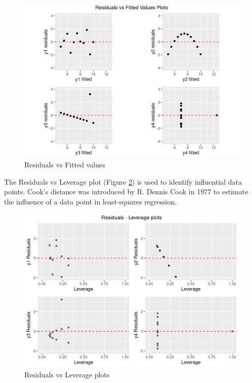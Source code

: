 \documentclass[12pt]{article}
\begin{document}
\begin{figure}[htbp]
\includegraphics[width=.7\textwidth]{RVF.png}
\centering
\caption{Residuals vs Fitted values}
\label{Fig:RVF}
\end{figure}

The Residuals vs Leverage plot (Figure \ref{Fig:RVL}) is used to identify influential data points. Cook's distance was introduced by R. Dennis Cook in 1977 to estimate the  influence of a data point in least-squares regression.

\begin{figure}[htbp]
\includegraphics[width=.7\textwidth]{RVL.png}
\centering
\caption{Residuals vs Leverage plots}
\label{Fig:RVL}
\end{figure}



	
\end{document}

